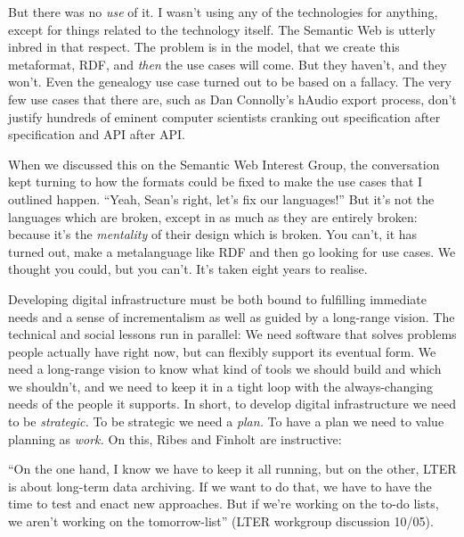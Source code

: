 \documentclass[10pt]{article}
\begin{document}
\begin{multicols}{2}
\begin{leftbar}
But there was no \emph{use} of it. I wasn't using any of the
technologies for anything, except for things related to the technology
itself. The Semantic Web is utterly inbred in that respect. The problem
is in the model, that we create this metaformat, RDF, and \emph{then}
the use cases will come. But they haven't, and they won't. Even the
genealogy use case turned out to be based on a fallacy. The very few use
cases that there are, such as Dan Connolly's hAudio export process,
don't justify hundreds of eminent computer scientists cranking out
specification after specification and API after API.

When we discussed this on the Semantic Web Interest Group, the
conversation kept turning to how the formats could be fixed to make the
use cases that I outlined happen. ``Yeah, Sean's right, let's fix our
languages!'' But it's not the languages which are broken, except in as
much as they are entirely broken: because it's the \emph{mentality} of
their design which is broken. You can't, it has turned out, make a
metalanguage like RDF and then go looking for use cases. We thought you
could, but you can't. It's taken eight years to realise. \cite{palmerDitchingSemanticWeb2008} 
\end{leftbar}

Developing digital infrastructure must be both bound to fulfilling
immediate needs and a sense of incrementalism as well as guided by a
long-range vision. The technical and social lessons run in parallel: We
need software that solves problems people actually have right now, but
can flexibly support its eventual form. We need a long-range vision to
know what kind of tools we should build and which we shouldn't, and we
need to keep it in a tight loop with the always-changing needs of the
people it supports. In short, to develop digital infrastructure we need
to be \emph{strategic.} To be strategic we need a \emph{plan.} To have a
plan we need to value planning as \emph{work.} On this, Ribes and
Finholt are instructive:

\begin{leftbar}
``On the one hand, I know we have to keep it all running, but on the
other, LTER is about long-term data archiving. If we want to do that, we
have to have the time to test and enact new approaches. But if we're
working on the to-do lists, we aren't working on the tomorrow-list''
(LTER workgroup discussion 10/05).


\end{leftbar}
\end{multicols}
\end{document}

